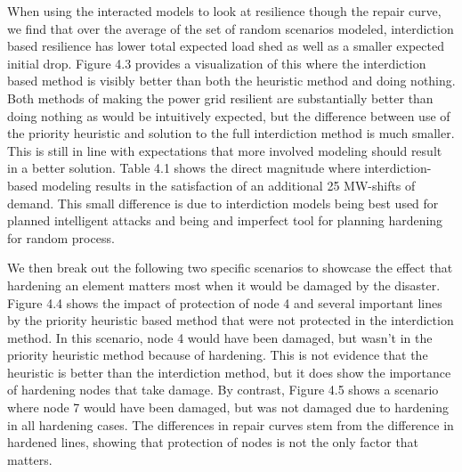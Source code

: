 When using the interacted models to look at resilience though the repair curve, we find that over the average of the set of random scenarios modeled, interdiction based resilience has lower total expected load shed as well as a smaller expected initial drop. Figure 4.3 provides a visualization of this where the interdiction based method is visibly better than both the heuristic method and doing nothing. Both methods of making the power grid resilient are substantially better than doing nothing as would be intuitively expected, but the difference between use of the priority heuristic and solution to the full interdiction method is much smaller. This is still in line with expectations that more involved modeling should result in a better solution. Table 4.1 shows the direct magnitude where interdiction-based modeling results in the satisfaction of an additional 25 MW-shifts of demand. This small difference is due to interdiction models being best used for planned intelligent attacks and being and imperfect tool for planning hardening for random process.

We then break out the following two specific scenarios to showcase the effect that hardening an element matters most when it would be damaged by the disaster. Figure 4.4 shows the impact of protection of node 4 and several important lines by the priority heuristic based method that were not protected in the interdiction method. In this scenario, node 4 would have been damaged, but wasn't in the priority heuristic method because of hardening. This is not evidence that the heuristic is better than the interdiction method, but it does show the importance of hardening nodes that take damage. By contrast, Figure 4.5 shows a scenario where node 7 would have been damaged, but was not damaged due to hardening in all hardening cases. The differences in repair curves stem from the difference in hardened lines, showing that protection of nodes is not the only factor that matters. 

